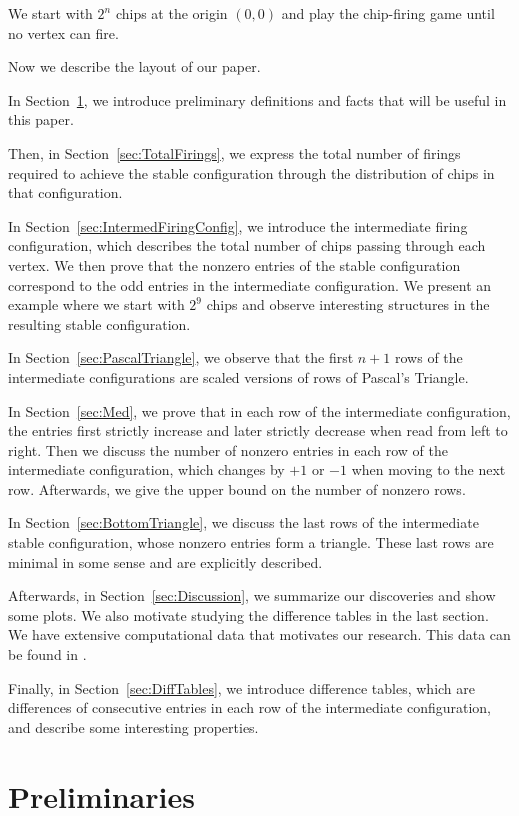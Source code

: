 \documentclass[11pt]{article}
\theoremstyle{definition}
\theoremstyle{remark}
\begin{document}
We start with $2^n$ chips at the origin $(0, 0)$ and play the chip-firing game until no vertex can fire.

Now we describe the layout of our paper. 

In Section~\ref{sec:prelim}, we introduce preliminary definitions and facts that will be useful in this paper.

Then, in Section~\ref{sec:TotalFirings}, we express the total number of firings required to achieve the stable configuration through the distribution of chips in that configuration.

In Section~\ref{sec:IntermedFiringConfig}, we introduce the intermediate firing configuration, which describes the total number of chips passing through each vertex. We then prove that the nonzero entries of the stable configuration correspond to the odd entries in the intermediate configuration. We present an example where we start with $2^9$ chips and observe interesting structures in the resulting stable configuration.

In Section~\ref{sec:PascalTriangle}, we observe that the first $n+1$ rows of the intermediate configurations are scaled versions of rows of Pascal's Triangle.

In Section~\ref{sec:Med}, we prove that in each row of the intermediate configuration, the entries first strictly increase and later strictly decrease when read from left to right. Then we discuss the number of nonzero entries in each row of the intermediate configuration, which changes by $+1$ or $-1$ when moving to the next row. Afterwards, we give the upper bound on the number of nonzero rows.

In Section~\ref{sec:BottomTriangle}, we discuss the last rows of the intermediate stable configuration, whose nonzero entries form a triangle. These last rows are minimal in some sense and are explicitly described.

Afterwards, in Section~\ref{sec:Discussion}, we summarize our discoveries and show some plots. We also motivate studying the difference tables in the last section. We have extensive computational data that motivates our research. This data can be found in \cite{GithubData}.

Finally, in Section~\ref{sec:DiffTables}, we introduce difference tables, which are differences of consecutive entries in each row of the intermediate configuration, and describe some interesting properties.


\section{Preliminaries}\label{sec:prelim}
\end{document}
